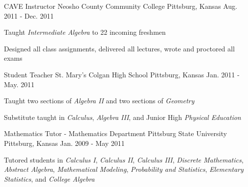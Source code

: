 \begin{cventries}
  \cventry
    {CAVE Instructor}
    {Neosho County Community College}
    {Pittsburg, Kansas}
    {Aug. 2011 - Dec. 2011}
    {
      \begin{expitems}
        \item {Taught \textit{Intermediate Algebra} to 22 incoming freshmen}
        \item {Designed all class assignments, delivered all lectures, wrote and
            proctored all exams}
      \end{expitems}
    }
    
  \cventry
    {Student Teacher}
    {St. Mary's Colgan High School}
    {Pittsburg, Kansas}
    {Jan. 2011 - May. 2011}
    {
      \begin{expitems}
      \item {Taught two sections of \textit{Algebra II} and two sections of
          \textit{Geometry}}
        \item {Substitute taught in \textit{Calculus}, \textit{Algebra III}, and
            Junior High \textit{Physical Education}}
      \end{expitems}
    }

  \cventry
    {Mathematics Tutor - Mathematics Department}
    {Pittsburg State University}
    {Pittsburg, Kansas}
    {Jan. 2009 - May 2011}
    {
      \begin{expitems}
      \item {Tutored students in \textit{Calculus I}, \textit{Calculus II},
          \textit{Calculus III}, \textit{Discrete Mathematics}, \textit{Abstract
            Algebra}, \textit{Mathematical Modeling}, \textit{Probability and
            Statistics}, \textit{Elementary Statistics}, and \textit{College
            Algebra}}
      \end{expitems}
    }
\end{cventries}